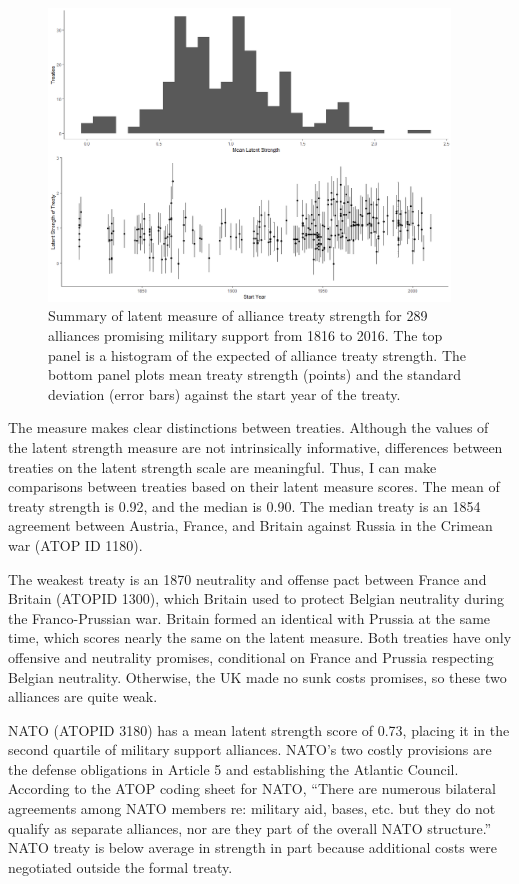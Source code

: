 \documentclass[12pt]{article}
\begin{document}
\begin{figure}
	\centering
		\includegraphics[width=0.95\textwidth]{../figures/ls-summary.png}
	\caption{Summary of latent measure of alliance treaty strength for 289 alliances promising military support from 1816 to 2016. The top panel is a histogram of the expected of alliance treaty strength. The bottom panel plots mean treaty strength (points) and the standard deviation (error bars) against the start year of the treaty.}
	\label{fig:ls-summary}
\end{figure}


The measure makes clear distinctions between treaties. 
Although the values of the latent strength measure are not intrinsically informative, differences between treaties on the latent strength scale are meaningful. 
Thus, I can make comparisons between treaties based on their latent measure scores. 
The mean of treaty strength is 0.92, and the median is 0.90. 
The median treaty is an 1854 agreement between Austria, France, and Britain against Russia in the Crimean war (ATOP ID 1180). 


The weakest treaty is an 1870 neutrality and offense pact between France and Britain (ATOPID 1300), which Britain used to protect Belgian neutrality during the Franco-Prussian war.  
Britain formed an identical with Prussia at the same time, which scores nearly the same on the latent measure. 
Both treaties have only offensive and neutrality promises, conditional on France and Prussia respecting Belgian neutrality. 
Otherwise, the UK made no sunk costs promises, so these two alliances are quite weak. 


NATO (ATOPID 3180) has a mean latent strength score of 0.73, placing it in the second quartile of military support alliances. 
NATO's two costly provisions are the defense obligations in Article 5 and establishing the Atlantic Council. 
According to the ATOP coding sheet for NATO, ``There are numerous bilateral agreements among NATO members re: military aid, bases, etc. but they do not qualify as separate alliances, nor are they part of the overall NATO structure.''
NATO treaty is below average in strength in part because additional costs were negotiated outside the formal treaty.    
\end{document}
